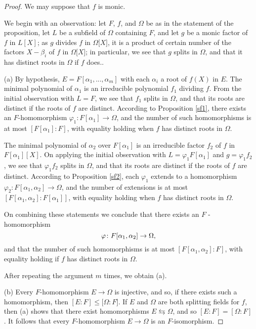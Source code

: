 \documentclass[a4paper,11pt,final,openany]{memoir}
\theoremstyle{nonumberplain}
\newtheorem{proof}{Proof.}
\begin{document}
\begin{proof}
We may suppose that $f$ is monic.

We begin with an observation: let $F$, $f$, and $\Omega$ be as in the
statement of the proposition, let $L$ be a subfield of $\Omega$ containing
$F$, and let $g$ be a monic factor of $f$ in $L[X]$; as $g$ divides $f$ in
$\Omega\lbrack X]$, it is a product of certain number of the factors
$X-\beta_{i}$ of $f$ in $\Omega\lbrack X]$; in particular, we see that $g$
splits in $\Omega$, and that it has distinct roots in $\Omega$ if $f$ does..

(a) By hypothesis, $E=F[\alpha_{1},...,\alpha_{m}]$ with each $\alpha_{i}$ a
root of $f(X)$ in $E$. The minimal polynomial of $\alpha_{1}$ is an
irreducible polynomial $f_{1}$ dividing $f$. From the initial observation with
$L=F$, we see that $f_{1}$ splits in $\Omega$, and that its roots are distinct
if the roots of $f$ are distinct. According to Proposition \ref{sf1}, there
exists an $F$-homomorphism $\varphi_{1}\colon F[\alpha_{1}]\rightarrow\Omega$,
and the number of such homomorphisms is at most $[F[\alpha_{1}]\colon F]$,
with equality holding when $f$ has distinct roots in $\Omega$.

The minimal polynomial of $\alpha_{2}$ over $F[\alpha_{1}]$ is an irreducible
factor $f_{2}$ of $f$ in $F[\alpha_{1}][X]$. On applying the initial
observation with $L=\varphi_{1}F[\alpha_{1}]$ and $g=\varphi_{1}f_{2}$, we see
that $\varphi_{1}f_{2}$ splits in $\Omega$, and that its roots are distinct if
the roots of $f$ are distinct. According to Proposition \ref{sf2}, each
$\varphi_{1}$ extends to a homomorphism $\varphi_{2}\colon F[\alpha_{1}%
,\alpha_{2}]\rightarrow\Omega$, and the number of extensions is at most
$[F[\alpha_{1},\alpha_{2}]\colon F[\alpha_{1}]]$, with equality holding when
$f$ has distinct roots in $\Omega.$

On combining these statements we conclude that there exists an $F$%
-homomorphism
\[
\varphi\colon F[\alpha_{1},\alpha_{2}]\rightarrow\nolinebreak\Omega,
\]
and that the number of such homomorphisms is at most $[F[\alpha_{1},\alpha
_{2}]\colon F]$, with equality holding if $f$ has distinct roots in $\Omega.$

After repeating the argument $m$ times, we obtain (a).

(b) Every $F$-homomorphism $E\rightarrow\Omega$ is injective, and so, if there
exists such a homomorphism, then $[E\colon F]\leq\lbrack\Omega\colon F]$. If
$E$ and $\Omega$ are both splitting fields for $f$, then (a) shows that there
exist homomorphisms $E\leftrightarrows\Omega$, and so $[E\colon F]=[\Omega
\colon F]$. It follows that every $F$-homomorphism $E\rightarrow\Omega$ is an
$F$-isomorphism.
\end{proof}
\end{document}
